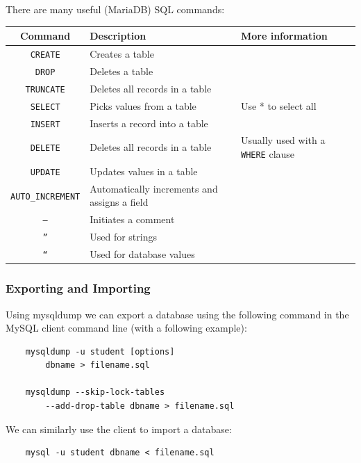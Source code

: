 There are many useful (MariaDB) SQL commands:
\begin{center}
    \begin{tabular}{| c | p{5cm} | p{5cm} |}
        \hline
        Command & Description & More information \\
        \hline \hline
        \texttt{CREATE} 
        & Creates a table 
        & \\
        \hline
        \texttt{DROP} 
        & Deletes a table 
        & \\
        \hline 
        \texttt{TRUNCATE} 
        & Deletes all records in a table 
        & \\
        \hline
        \texttt{SELECT}
        & Picks values from a table 
        & Use * to select all \\
        \hline
        \texttt{INSERT} 
        & Inserts a record into a table 
        & \\
        \hline
        \texttt{DELETE} 
        & Deletes all records in a table 
        & Usually used with a \texttt{WHERE} clause \\
        \hline
        \texttt{UPDATE} 
        & Updates values in a table 
        & \\
        \hline
        \texttt{AUTO\_INCREMENT} 
        & Automatically increments and assigns a field
        & \\
        \hline
        \texttt{--} 
        & Initiates a comment 
        & \\
        \hline
        \texttt{''} 
        & Used for strings & \\
        \hline
        \texttt{``} 
        & Used for database values & \\
        \hline
    \end{tabular}
\end{center}

\subsubsection{Exporting and Importing}

Using mysqldump we can export a database using the following
command in the MySQL client command line (with a following 
example): 
\begin{lstlisting}
    mysqldump -u student [options]
        dbname > filename.sql

    mysqldump --skip-lock-tables
        --add-drop-table dbname > filename.sql
\end{lstlisting} We can similarly use the client to import
a database: \begin{lstlisting}
    mysql -u student dbname < filename.sql
\end{lstlisting}

